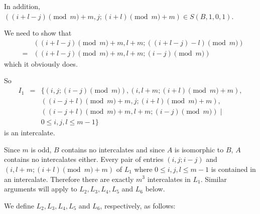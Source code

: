 \documentclass[12pt]{report}
\begin{document}
In addition, $((i+l-j) \pmod{m}+m, j; (i+l) \pmod{m}+m) \in S(B,1,0,1)$. 

We need to show that 
\begin{eqnarray*}
&& ((i+l-j) \pmod{m}+m, l+m; ((i+l-j) - l)  \pmod{m} ) \\
&=& ((i+l-j) \pmod{m}+m, l+m; (i-j) \pmod{m} )
\end{eqnarray*}
which it obviously does.

So 
\begin{eqnarray*}
I_1 &=& \{ (i,j; (i-j)\pmod{m}), (i,l+m; (i+l) \pmod{m}+m), \\
&& ((i-j+l) \pmod{m}+m,j; (i+l) \pmod{m}+m),\\
&& ((i-j+l) \pmod{m}+m,l+m; (i-j)\pmod{m}) \mid \\
&& 0 \leq i,j,l \leq m-1 \}
\end{eqnarray*}
is an intercalate.

Since $m$ is odd, $B$ contains no intercalates \cite{njcint} and
since $A$ is isomorphic to $B$, $A$ contains no intercalates either.
Every pair of entries $(i,j; i-j)$ and $(i,l+m; (i+l) \pmod{m}+m)$ of $L_1$
where $0 \leq i,j,l \leq m-1$ is contained in an
intercalate.  Therefore there are exactly $m^3$ intercalates in $L_1$.  Similar
arguments will apply to $L_2, L_3, L_4, L_5$ and $L_6$ below.

We define $L_2, L_3, L_4, L_5$ and $L_6$, respectively, as follows:
\end{document}
